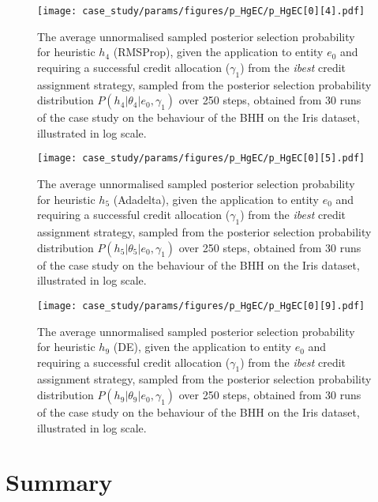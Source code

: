 \begin{figure}[htpb]
	\centering
	\texttt{[image: case\_study/params/figures/p\_HgEC/p\_HgEC[0][4].pdf]}
	\caption{The average unnormalised sampled posterior selection probability for heuristic $h_{4}$ (\acs{RMSProp}), given the application to entity $e_{0}$ and requiring a successful credit allocation ($\gamma_{1}$) from the \textit{ibest} credit assignment strategy, sampled from the posterior selection probability distribution $P(h_{4} \vert \theta_{4} \vert e_{0}, \gamma_{1})$ over 250 steps, obtained from 30 runs of the case study on the behaviour of the \acs{BHH} on the Iris dataset, illustrated in log scale.}
	\label{fig:app:case_study_additional:p_HgEC:0:4}
\end{figure}

\begin{figure}[htpb]
	\centering
	\texttt{[image: case\_study/params/figures/p\_HgEC/p\_HgEC[0][5].pdf]}
	\caption{The average unnormalised sampled posterior selection probability for heuristic $h_{5}$ (\acs{Adadelta}), given the application to entity $e_{0}$ and requiring a successful credit allocation ($\gamma_{1}$) from the \textit{ibest} credit assignment strategy, sampled from the posterior selection probability distribution $P(h_{5} \vert \theta_{5} \vert e_{0}, \gamma_{1})$ over 250 steps, obtained from 30 runs of the case study on the behaviour of the \acs{BHH} on the Iris dataset, illustrated in log scale.}
	\label{fig:app:case_study_additional:p_HgEC:0:5}
\end{figure}

\begin{figure}[htpb]
	\centering
	\texttt{[image: case\_study/params/figures/p\_HgEC/p\_HgEC[0][9].pdf]}
	\caption{The average unnormalised sampled posterior selection probability for heuristic $h_{9}$ (\acs{DE}), given the application to entity $e_{0}$ and requiring a successful credit allocation ($\gamma_{1}$) from the \textit{ibest} credit assignment strategy, sampled from the posterior selection probability distribution $P(h_{9} \vert \theta_{9} \vert e_{0}, \gamma_{1})$ over 250 steps, obtained from 30 runs of the case study on the behaviour of the \acs{BHH} on the Iris dataset, illustrated in log scale.}
	\label{fig:app:case_study_additional:p_HgEC:0:9}
\end{figure}

\section{Summary}
\label{app:case_study_additional:summary}